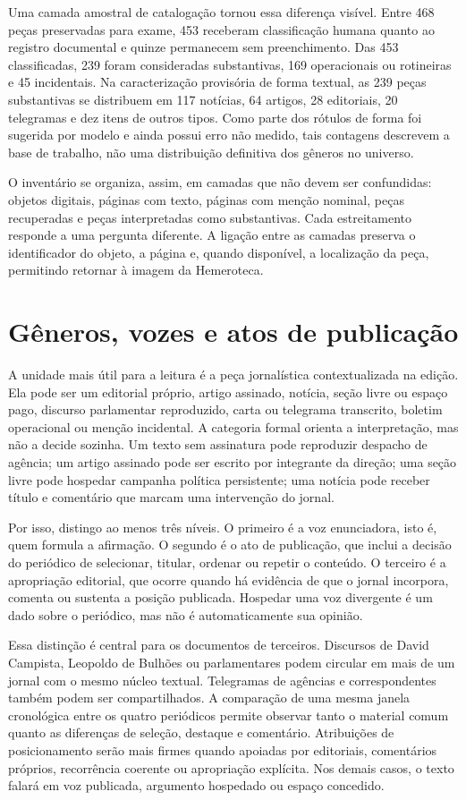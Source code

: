 Uma camada amostral de catalogação tornou essa diferença visível. Entre 468 peças preservadas para exame, 453 receberam classificação humana quanto ao registro documental e quinze permanecem sem preenchimento. Das 453 classificadas, 239 foram consideradas substantivas, 169 operacionais ou rotineiras e 45 incidentais. Na caracterização provisória de forma textual, as 239 peças substantivas se distribuem em 117 notícias, 64 artigos, 28 editoriais, 20 telegramas e dez itens de outros tipos. Como parte dos rótulos de forma foi sugerida por modelo e ainda possui erro não medido, tais contagens descrevem a base de trabalho, não uma distribuição definitiva dos gêneros no universo.

O inventário se organiza, assim, em camadas que não devem ser confundidas: objetos digitais, páginas com texto, páginas com menção nominal, peças recuperadas e peças interpretadas como substantivas. Cada estreitamento responde a uma pergunta diferente. A ligação entre as camadas preserva o identificador do objeto, a página e, quando disponível, a localização da peça, permitindo retornar à imagem da Hemeroteca.

\section{Gêneros, vozes e atos de publicação}

A unidade mais útil para a leitura é a peça jornalística contextualizada na edição. Ela pode ser um editorial próprio, artigo assinado, notícia, seção livre ou espaço pago, discurso parlamentar reproduzido, carta ou telegrama transcrito, boletim operacional ou menção incidental. A categoria formal orienta a interpretação, mas não a decide sozinha. Um texto sem assinatura pode reproduzir despacho de agência; um artigo assinado pode ser escrito por integrante da direção; uma seção livre pode hospedar campanha política persistente; uma notícia pode receber título e comentário que marcam uma intervenção do jornal.

Por isso, distingo ao menos três níveis. O primeiro é a voz enunciadora, isto é, quem formula a afirmação. O segundo é o ato de publicação, que inclui a decisão do periódico de selecionar, titular, ordenar ou repetir o conteúdo. O terceiro é a apropriação editorial, que ocorre quando há evidência de que o jornal incorpora, comenta ou sustenta a posição publicada. Hospedar uma voz divergente é um dado sobre o periódico, mas não é automaticamente sua opinião.

Essa distinção é central para os documentos de terceiros. Discursos de David Campista, Leopoldo de Bulhões ou parlamentares podem circular em mais de um jornal com o mesmo núcleo textual. Telegramas de agências e correspondentes também podem ser compartilhados. A comparação de uma mesma janela cronológica entre os quatro periódicos permite observar tanto o material comum quanto as diferenças de seleção, destaque e comentário. Atribuições de posicionamento serão mais firmes quando apoiadas por editoriais, comentários próprios, recorrência coerente ou apropriação explícita. Nos demais casos, o texto falará em voz publicada, argumento hospedado ou espaço concedido.

